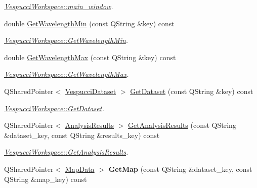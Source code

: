 \begin{DoxyCompactItemize}
\begin{DoxyCompactList}\small\item\em \hyperlink{class_vespucci_workspace_a48a0bc8ab860ca6a66e7eaf9b803b78a}{Vespucci\+Workspace\+::main\+\_\+window}. \end{DoxyCompactList}\item 
double \hyperlink{class_vespucci_workspace_a44602c48df21a32af2233a34a7962927}{Get\+Wavelength\+Min} (const Q\+String \&key) const 
\begin{DoxyCompactList}\small\item\em \hyperlink{class_vespucci_workspace_a44602c48df21a32af2233a34a7962927}{Vespucci\+Workspace\+::\+Get\+Wavelength\+Min}. \end{DoxyCompactList}\item 
double \hyperlink{class_vespucci_workspace_a72cae157ed3fb7d05b08ab7df29c07f5}{Get\+Wavelength\+Max} (const Q\+String \&key) const 
\begin{DoxyCompactList}\small\item\em \hyperlink{class_vespucci_workspace_a72cae157ed3fb7d05b08ab7df29c07f5}{Vespucci\+Workspace\+::\+Get\+Wavelength\+Max}. \end{DoxyCompactList}\item 
Q\+Shared\+Pointer$<$ \hyperlink{class_vespucci_dataset}{Vespucci\+Dataset} $>$ \hyperlink{class_vespucci_workspace_a440963226f8ea267b2cc2c255ee5f3a9}{Get\+Dataset} (const Q\+String \&key) const 
\begin{DoxyCompactList}\small\item\em \hyperlink{class_vespucci_workspace_a440963226f8ea267b2cc2c255ee5f3a9}{Vespucci\+Workspace\+::\+Get\+Dataset}. \end{DoxyCompactList}\item 
Q\+Shared\+Pointer$<$ \hyperlink{class_analysis_results}{Analysis\+Results} $>$ \hyperlink{class_vespucci_workspace_a141f6385dbd3fa57d317841d32776b45}{Get\+Analysis\+Results} (const Q\+String \&dataset\+\_\+key, const Q\+String \&results\+\_\+key) const 
\begin{DoxyCompactList}\small\item\em \hyperlink{class_vespucci_workspace_a141f6385dbd3fa57d317841d32776b45}{Vespucci\+Workspace\+::\+Get\+Analysis\+Results}. \end{DoxyCompactList}\item 
Q\+Shared\+Pointer$<$ \hyperlink{class_map_data}{Map\+Data} $>$ {\bfseries Get\+Map} (const Q\+String \&dataset\+\_\+key, const Q\+String \&map\+\_\+key) const \hypertarget{class_vespucci_workspace_a838c81c8a2cc734c2e0ce6fd8f79742a}{}\label{class_vespucci_workspace_a838c81c8a2cc734c2e0ce6fd8f79742a}


\end{DoxyCompactItemize}
